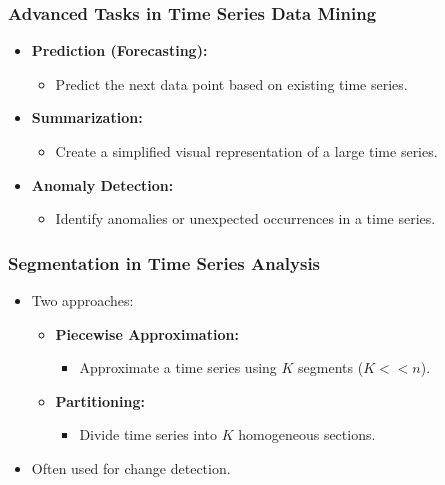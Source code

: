\begin{frame}[fragile]\frametitle{Advanced Tasks in Time Series Data Mining}
    \begin{itemize}
        \item \textbf{Prediction (Forecasting):}
            \begin{itemize}
                \item Predict the next data point based on existing time series.
            \end{itemize}
        \item \textbf{Summarization:}
            \begin{itemize}
                \item Create a simplified visual representation of a large time series.
            \end{itemize}
        \item \textbf{Anomaly Detection:}
            \begin{itemize}
                \item Identify anomalies or unexpected occurrences in a time series.
            \end{itemize}
    \end{itemize}
\end{frame}

\begin{frame}[fragile]\frametitle{Segmentation in Time Series Analysis}
    \begin{itemize}
        \item Two approaches:
            \begin{itemize}
                \item \textbf{Piecewise Approximation:}
                    \begin{itemize}
                        \item Approximate a time series using \( K \) segments (\( K << n \)).
                    \end{itemize}
                \item \textbf{Partitioning:}
                    \begin{itemize}
                        \item Divide time series into \( K \) homogeneous sections.
                    \end{itemize}
            \end{itemize}
        \item Often used for change detection.
    \end{itemize}
\end{frame}

